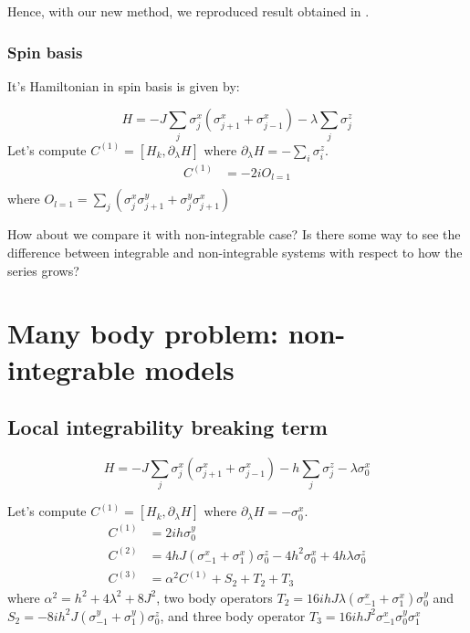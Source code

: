 \documentclass[11pt,a4paper]{article}
\begin{document}
Hence, with our new method, we reproduced result obtained in   \cite{del2012assisted, kolodrubetz2016geometry}.


\subsubsection{Spin basis}

It's Hamiltonian in spin basis is given by:

\begin{equation}
H= -J \sum_{j} \sigma_j^x (\sigma_{j+1}^x+ \sigma_{j-1}^x)  - \lambda \sum_{j} \sigma_j^z 
\end{equation}
Let's compute $C^{(1)}=[H_k,\partial_{\lambda} H] $ where $\partial_{\lambda} H= -\sum_i \sigma^z_i$. 
\begin{align*}
C^{(1)}&= -2 i O_{l=1}\\
\end{align*}
where $O_{l=1}=  \sum_j ( \sigma_j^x  \sigma_{j+1}^y +  \sigma_j^y  \sigma_{j+1}^x) $

How about we compare it with non-integrable case? Is there some way to see the difference between integrable and non-integrable systems with respect to how the series grows?

\section{Many body problem: non-integrable models}

\subsection{Local integrability breaking term}

\begin{equation}
H= -J \sum_{j} \sigma_j^x (\sigma_{j+1}^x+ \sigma_{j-1}^x) - h\sum_{j} \sigma_j^z -\lambda \sigma_0^x 
\end{equation}


Let's compute $C^{(1)}=[H_k,\partial_{\lambda} H] $ where $\partial_{\lambda} H= -\sigma^x_0$. 
\begin{align}
C^{(1)} &=2 i h\sigma^y_0  \\
C^{(2)} &=4 h J (\sigma_{-1}^x +  \sigma_1^x)\sigma_0^z-4 h^2\sigma_0^x+ 4 h \lambda
   \sigma_0^z \\
 C^{(3)}  &=\alpha^2 C^{(1)}+S_2+ T_2 +T_3
\end{align}
where $\alpha^2=h^2+4  \lambda ^2+8 J^2 $, two body operators $T_2=16 i h J \lambda( \sigma^x_{-1} +  \sigma_1^x) \sigma^y_0$ and $S_2=-8 i h^2 J (\sigma_{-1}^y+ \sigma_{1}^y) \sigma^z_0$, and three body operator $T_3=16 i h J^2\sigma^x_{-1} \sigma_0^y\sigma ^x_1$
\end{document}
